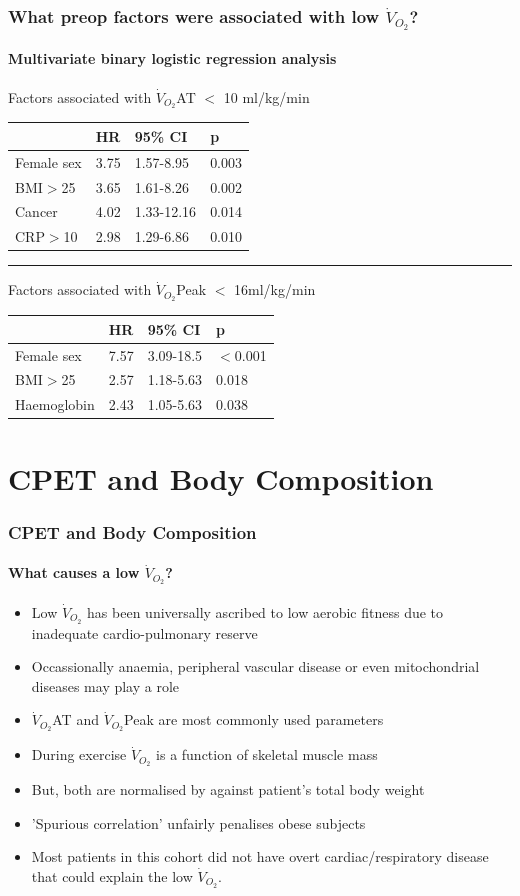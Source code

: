 \documentclass[10pt]{beamer}
\begin{document}
\begin{frame}
	\frametitle{What preop factors were associated with low $\dot{V}_{O_2}$?}
	\framesubtitle{Multivariate binary logistic regression analysis}
	Factors associated with $\dot{V}_{O_2}$AT $<$ 10 ml/kg/min
	\begin{table}
		\begin{tabular}{l| l l l}
			& HR   & 95\% CI    & p     \\ \hline
			Female sex & 3.75 & 1.57-8.95  & 0.003 \\
			BMI$>$25   & 3.65 & 1.61-8.26  & 0.002 \\
			Cancer     & 4.02 & 1.33-12.16 & 0.014 \\
			CRP$>$10   & 2.98 & 1.29-6.86  & 0.010
		\end{tabular}
	\end{table}
	\hrule
\pause
	\medskip
	Factors associated with $\dot{V}_{O_2}$Peak $<$ 16ml/kg/min
	\begin{table}
		\begin{tabular}{l| l l l}
			& HR   & 95\% CI   & p        \\ \hline
			Female sex  & 7.57 & 3.09-18.5 & $<$0.001 \\
			BMI$>$25    & 2.57 & 1.18-5.63 & 0.018    \\
			Haemoglobin & 2.43 & 1.05-5.63 & 0.038
		\end{tabular}
	\end{table}
\end{frame}



\section[Chapter 4]{CPET and Body Composition}

\begin{frame}
	\frametitle{ CPET and Body Composition}
	\framesubtitle{What causes a low $\dot{V}_{O_2}$? }
	\begin{itemize}
		\item Low $\dot{V}_{O_2}$ has been universally ascribed to low aerobic fitness due to inadequate cardio-pulmonary reserve
		\item Occassionally anaemia, peripheral vascular disease or even mitochondrial diseases may play a role
		\item $\dot{V}_{O_2}$AT and $\dot{V}_{O_2}$Peak are most commonly used parameters
		\item During exercise $\dot{V}_{O_2}$ is a function of skeletal muscle mass
		\item But, both are normalised by against patient's total body weight
		\item 'Spurious correlation' unfairly penalises obese subjects
		\item Most patients in this cohort did not have overt cardiac/respiratory disease that could explain the low $\dot{V}_{O_2}$.
	\end{itemize}
\end{frame}
\end{document}
